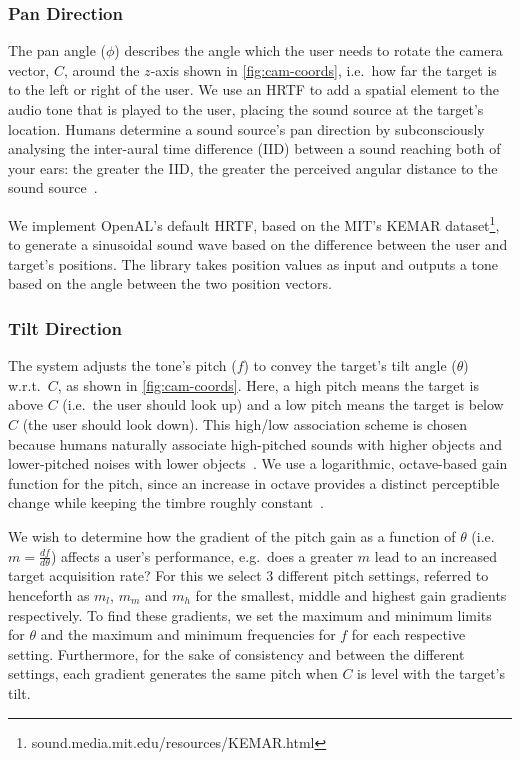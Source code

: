 \documentclass[sigconf, screen=true, anonymous=true]{acmart}
\begin{document}
\subsubsection{Pan Direction}

The pan angle ($\phi$) describes the angle which the user needs to rotate the camera vector, $C$, around the $z$-axis shown in \cref{fig:cam-coords}, i.e.\ how far the target is to the left or right of the user.
We use an HRTF to add a spatial element to the audio tone that is played to the user, placing the sound source at the target's location. 
Humans determine a sound source's pan direction by subconsciously analysing the inter-aural time difference (IID) between a sound reaching both of your ears: the greater the IID, the greater the perceived angular distance to the sound source~\cite{wightman1992dominant}.

We implement OpenAL's default HRTF, based on the MIT's KEMAR dataset\footnote{sound.media.mit.edu/resources/KEMAR.html}, to generate a sinusoidal sound wave based on the difference between the user and target's positions.
The library takes position values as input and outputs a tone based on the angle between the two position vectors. 

\subsubsection{Tilt Direction}

The system adjusts the tone's pitch ($f$) to convey the target's tilt angle ($\theta$) w.r.t.\ $C$, as shown in \cref{fig:cam-coords}. 
Here, a high pitch means the target is above $C$ (i.e.\ the user should look up) and a low pitch means the target is below $C$ (the user should look down).
This high/low association scheme is chosen because humans naturally associate high-pitched sounds with higher objects and lower-pitched noises with lower objects~\cite{pratt1930spatial, blauert1997spatial}.
We use a logarithmic, octave-based gain function for the pitch, since an increase in octave provides a distinct perceptible change while keeping the timbre roughly constant~\cite{shepard1964circularity}.

We wish to determine how the gradient of the pitch gain as a function of $\theta$ (i.e.\ $m = \frac{df}{d\theta}$) affects a user's performance, e.g.\ does a greater $m$ lead to an increased target acquisition rate?
For this we select 3 different pitch settings, referred to henceforth as $m_l$, $m_m$ and $m_h$ for the smallest, middle and highest gain gradients respectively. 
To find these gradients, we set the maximum and minimum limits for $\theta$ and the maximum and minimum frequencies for $f$ for each respective setting.
Furthermore, for the sake of consistency and between the different settings, each gradient generates the same pitch when $C$ is level with the target's tilt. 
\end{document}
